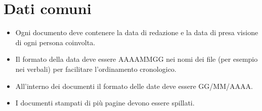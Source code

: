 \section{Dati comuni}
\begin{itemize}
	\item Ogni documento deve contenere la data di redazione e la data di presa visione di ogni persona coinvolta. 
	\item Il formato della data deve essere AAAAMMGG nei nomi dei file (per esempio nei verbali) per facilitare l'ordinamento cronologico. 
	\item All'interno dei documenti il formato delle date deve essere GG/MM/AAAA.
	\item I documenti stampati di pi\`u pagine devono essere spillati.
\end{itemize}

